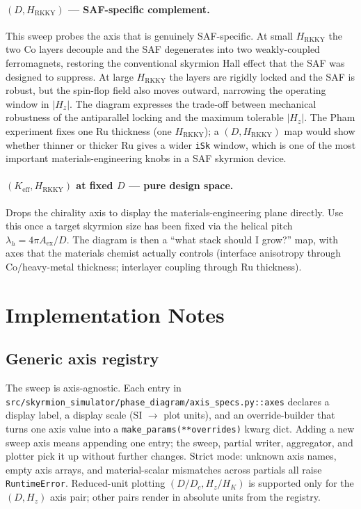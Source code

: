 \documentclass[11pt,a4paper]{article}
\newcommand{\Keff}{K_{\text{eff}}}
\newcommand{\Aex}{A_{\text{ex}}}
\newcommand{\HK}{H_K}
\newcommand{\Dc}{D_c}
\newcommand{\HRKKY}{H_{\text{RKKY}}}
\begin{document}
\paragraph{$(D, \HRKKY)$ --- SAF-specific complement.}
This sweep probes the axis that is genuinely
SAF-specific. At small $\HRKKY$ the two Co layers
decouple and the SAF degenerates into two weakly-coupled
ferromagnets, restoring the conventional skyrmion Hall
effect that the SAF was designed to suppress. At large
$\HRKKY$ the layers are rigidly locked and the SAF is
robust, but the spin-flop field also moves outward,
narrowing the operating window in $|H_z|$. The diagram
expresses the trade-off between mechanical robustness of
the antiparallel locking and the maximum tolerable
$|H_z|$. The Pham experiment fixes one Ru thickness
(one $\HRKKY$); a $(D, \HRKKY)$ map would show whether
thinner or thicker Ru gives a wider \texttt{iSk} window,
which is one of the most important materials-engineering
knobs in a SAF skyrmion device.

\paragraph{$(\Keff, \HRKKY)$ at fixed $D$ --- pure design
space.}
Drops the chirality axis to display the
materials-engineering plane directly. Use this once a
target skyrmion size has been fixed via the helical pitch
$\lambda_h = 4\pi \Aex / D$. The diagram is then a
``what stack should I grow?'' map, with axes that the
materials chemist actually controls (interface anisotropy
through Co/heavy-metal thickness; interlayer coupling
through Ru thickness).

\section{Implementation Notes}
\label{sec:impl}

\subsection{Generic axis registry}

The sweep is axis-agnostic. Each entry in
\texttt{src/skyrmion\_simulator/phase\_diagram/axis\_specs.py::axes} declares a
display label, a display scale (SI $\to$ plot units), and
an override-builder that turns one axis value into a
\texttt{make\_params(**overrides)} kwarg dict. Adding a new
sweep axis means appending one entry; the sweep, partial
writer, aggregator, and plotter pick it up without further
changes. Strict mode: unknown axis names, empty axis
arrays, and material-scalar mismatches across partials all
raise \texttt{RuntimeError}. Reduced-unit plotting
$(D / \Dc, H_z / \HK)$ is supported only for the
$(D, H_z)$ axis pair; other pairs render in absolute units
from the registry.
\end{document}
